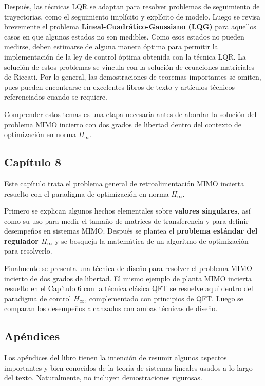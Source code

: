Después, las técnicas LQR se adaptan para resolver problemas de seguimiento de trayectorias, como el seguimiento implícito y explícito de modelo. Luego se revisa brevemente el problema \textbf{Lineal-Cuadrático-Gaussiano (LQG)} para aquellos casos en que algunos estados no son medibles. Como esos estados no pueden medirse, deben estimarse de alguna manera óptima para permitir la implementación de la ley de control óptima obtenida con la técnica LQR. La solución de estos problemas se vincula con la solución de ecuaciones matriciales de Riccati. Por lo general, las demostraciones de teoremas importantes se omiten, pues pueden encontrarse en excelentes libros de texto y artículos técnicos referenciados cuando se requiere.

Comprender estos temas es una etapa necesaria antes de abordar la solución del problema MIMO incierto con dos grados de libertad dentro del contexto de optimización en norma \(H_{\infty}\).

\subsection{Capítulo 8}
Este capítulo trata el problema general de retroalimentación MIMO incierta resuelto con el paradigma de optimización en norma \(H_{\infty}\).

Primero se explican algunos hechos elementales sobre \textbf{valores singulares}, así como su uso para medir el tamaño de matrices de transferencia y para definir desempeños en sistemas MIMO. Después se plantea el \textbf{problema estándar del regulador \(H_{\infty}\)} y se bosqueja la matemática de un algoritmo de optimización para resolverlo.

Finalmente se presenta una técnica de diseño para resolver el problema MIMO incierto de dos grados de libertad. El mismo ejemplo de planta MIMO incierta resuelto en el Capítulo 6 con la técnica clásica QFT se resuelve aquí dentro del paradigma de control \(H_{\infty}\), complementado con principios de QFT. Luego se comparan los desempeños alcanzados con ambas técnicas de diseño.

\subsection{Apéndices}
Los apéndices del libro tienen la intención de resumir algunos aspectos importantes y bien conocidos de la teoría de sistemas lineales usados a lo largo del texto. Naturalmente, no incluyen demostraciones rigurosas.


